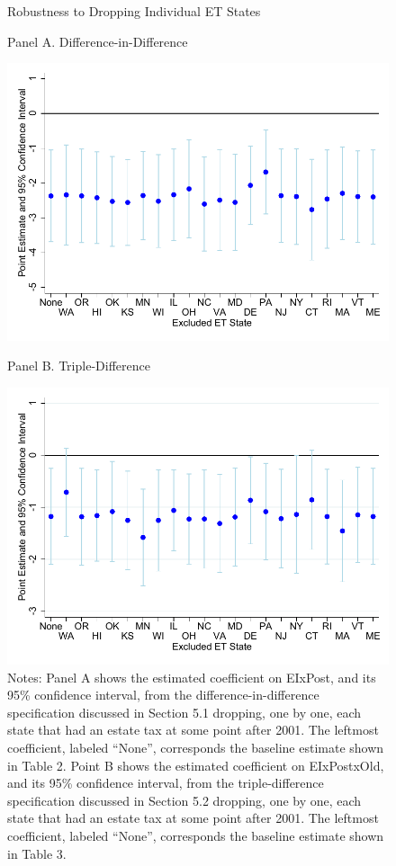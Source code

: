 \documentclass[12pt]{article}
\begin{document}
\begin{figure}
\centering
\caption{Robustness to Dropping Individual ET States}
\label{newtab33}
	\caption*{Panel A. Difference-in-Difference}
	\includegraphics[width=.7\textwidth]{../Figures/FigureB3_a.pdf}
	\caption*{Panel B. Triple-Difference}
	\includegraphics[width=.7\textwidth]{../Figures/FigureB3_b.pdf}
	\caption*{\footnotesize Notes: Panel A shows the estimated coefficient on EIxPost, and its 95\% confidence interval, from the difference-in-difference specification discussed in Section 5.1 dropping, one by one, each state that had an estate tax at some point after 2001. The leftmost coefficient, labeled ``None'', corresponds the baseline estimate shown in Table 2. Point B shows the estimated coefficient on EIxPostxOld, and its 95\% confidence interval, from the triple-difference specification discussed in Section 5.2 dropping, one by one, each state that had an estate tax at some point after 2001. The leftmost coefficient, labeled ``None'', corresponds the baseline estimate shown in Table 3.}
\end{figure}
\end{document}

